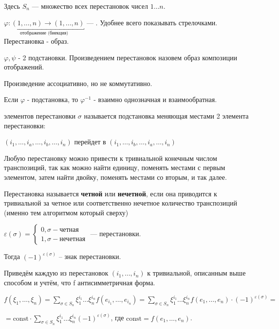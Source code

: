 Здесь $S_n$ --- множество всех перестановок чисел $1 \dots n$.


\(\underbracket{\varphi: (1, \ldots,n) \rightarrow (1,\ldots,n)}_{\text{отображение (биекция)}}\) --- . Удобнее всего показывать стрелочками. Перестановка - образ.

\(\varphi, \psi\) - 2 подстановки. Произведением перестановок назовем образ композиции отображений.

Произведение ассоциативно, но не коммутативно.

Если $\varphi $ - подстановка, то $\varphi^{-1}$ - взаимно однозначная и взаимообратная.

 элементов перестановки \(\sigma\) называется подстановка меняющая местами 2 элемента перестановки:

\((i_1,\ldots,i_a,\ldots,i_b,\ldots,i_n)\)
перейдет в \((i_1,\ldots,i_b,\ldots,i_a,\ldots,i_n)\)

Любую перестановку можно привести к тривиальной конечным числом транспозиций, так как можно найти единицу, поменять местами с первым элементом, затем найти двойку, поменять местами со вторым, и так далее.

Перестановка называется \textbf{четной} или \textbf{нечетной}, если она приводится к тривиальной за четное или соответственно нечетное количество транспозиций (именно тем алгоритмом который сверху)

\(\varepsilon(\sigma) = \begin{cases}
    0, \sigma - \text{четная} \\
    1, \sigma - \text{нечетная}
\end{cases}\) ---  перестановки.

Тогда $(-1)^{\varepsilon(\sigma)}$ -- знак перестановки.

Приведём каждую из перестановок $(i_1, \dots, i_n)$ к тривиальной, описанным выше способом и учтём, что f антисимметричная форма.

\(f(\xi_1,\ldots,\xi_n) =  \sum\limits_{\sigma \in S_n} \xi_1^{i_1} \ldots \xi_n^{i_n} f(e_{i_1},\ldots,e_{i_n}) = \sum\limits_{\sigma \in S_n} \xi_1^{i_1} \ldots \xi_n^{i_n} f(e_1,\ldots,e_n)\cdot (-1)^{\varepsilon(\sigma)} =\)

\(= \text{const} \cdot \sum\limits_{\sigma \in S_n} \xi_1^{i_1} \ldots \xi_n^{i_n} (-1)^{\varepsilon(\sigma)}\), где \(\text{const} = f(e_1,\ldots, e_n)\).


